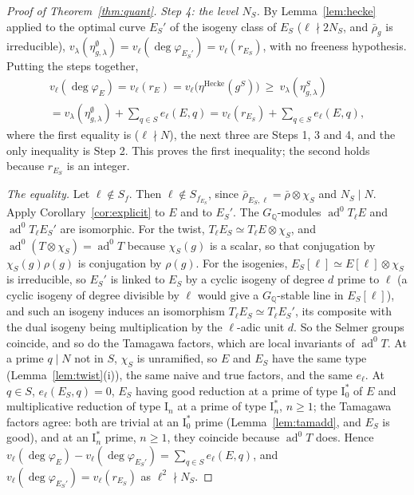 \documentclass[11pt]{amsart}
\theoremstyle{definition}
\newcommand{\Q}{\mathbb{Q}}
\newcommand{\degphi}{\deg\varphi_E}
\newcommand{\ad}{\operatorname{ad}^0}
\begin{document}
\begin{proof}[Proof of Theorem~\ref{thm:quant}]
\emph{Step 4: the level $N_S$.} By Lemma~\ref{lem:hecke} applied to the optimal curve $E_S'$ of the isogeny class of $E_S$ ($\ell\nmid2N_S$, and $\bar\rho_g$ is irreducible), $v_\lambda(\eta^\emptyset_{g,\lambda})=v_\ell(\deg\varphi_{E_S'})=v_\ell(r_{E_S})$, with no freeness hypothesis. Putting the steps together,
\begin{multline*}
v_\ell(\degphi)=v_\ell(r_E)=v_\ell\bigl(\eta^{\mathrm{Hecke}}(g^S)\bigr)\ \ge\ v_\lambda(\eta^S_{g,\lambda})\\
=v_\lambda(\eta^\emptyset_{g,\lambda})+\sum_{q\in S}e_\ell(E,q)=v_\ell(r_{E_S})+\sum_{q\in S}e_\ell(E,q),
\end{multline*}
where the first equality is \cite[Theorem 2.2]{ARS12} ($\ell\nmid N$), the next three are Steps 1, 3 and 4, and the only inequality is Step 2. This proves the first inequality; the second holds because $r_{E_S}$ is an integer.

\emph{The equality.} Let $\ell\notin S_f$. Then $\ell\notin S_{f_{E_S}}$, since $\bar\rho_{E_S,\ell}=\bar\rho\otimes\chi_S$ and $N_S\mid N$. Apply Corollary~\ref{cor:explicit} to $E$ and to $E_S'$. The $G_\Q$-modules $\ad T_\ell E$ and $\ad T_\ell E_S'$ are isomorphic. For the twist, $T_\ell E_S\simeq T_\ell E\otimes\chi_S$, and $\ad(T\otimes\chi_S)=\ad T$ because $\chi_S(g)$ is a scalar, so that conjugation by $\chi_S(g)\rho(g)$ is conjugation by $\rho(g)$. For the isogenies, $E_S[\ell]\simeq E[\ell]\otimes\chi_S$ is irreducible, so $E_S'$ is linked to $E_S$ by a cyclic isogeny of degree $d$ prime to $\ell$ (a cyclic isogeny of degree divisible by $\ell$ would give a $G_\Q$-stable line in $E_S[\ell]$), and such an isogeny induces an isomorphism $T_\ell E_S\simeq T_\ell E_S'$, its composite with the dual isogeny being multiplication by the $\ell$-adic unit $d$. So the Selmer groups coincide, and so do the Tamagawa factors, which are local invariants of $\ad T$. At a prime $q\mid N$ not in $S$, $\chi_S$ is unramified, so $E$ and $E_S$ have the same type (Lemma~\ref{lem:twist}(i)), the same naive and true factors, and the same $e_\ell$. At $q\in S$, $e_\ell(E_S,q)=0$, $E_S$ having good reduction at a prime of type $\mathrm{I}_0^*$ of $E$ and multiplicative reduction of type $\mathrm{I}_n$ at a prime of type $\mathrm{I}_n^*$, $n\ge1$; the Tamagawa factors agree: both are trivial at an $\mathrm{I}_0^*$ prime (Lemma~\ref{lem:tamadd}, and $E_S$ is good), and at an $\mathrm{I}_n^*$ prime, $n\ge1$, they coincide because $\ad T$ does. Hence $v_\ell(\degphi)-v_\ell(\deg\varphi_{E_S'})=\sum_{q\in S}e_\ell(E,q)$, and $v_\ell(\deg\varphi_{E_S'})=v_\ell(r_{E_S})$ as $\ell^2\nmid N_S$.
\end{proof}
\end{document}
